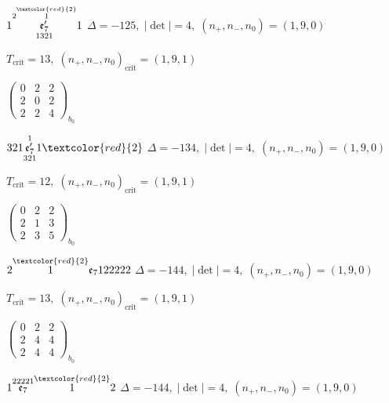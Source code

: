 \documentclass[10pt]{article}
\begin{document}
\smallskip

$1\overset{2\overset{\textcolor{red}{2}}{1}}{\underset{1321}{\mathfrak{e}_7'}}1$ \quad $\Delta=-125,\; |\det|=4,\; (n_+,n_-,n_0)=(1,9,0)$

\hspace{1em}$T_{\text{crit}}=13,\; (n_+,n_-,n_0)_{\text{crit}}=(1,9,1)$

\hspace{2em}$\left(\begin{smallmatrix}0 & 2 & 2 \\ 2 & 0 & 2 \\ 2 & 2 & 4\end{smallmatrix}\right)_{\!b_0}$

\smallskip

$321\overset{1}{\underset{321}{\mathfrak{e}_7'}}1\textcolor{red}{2}$ \quad $\Delta=-134,\; |\det|=4,\; (n_+,n_-,n_0)=(1,9,0)$

\hspace{1em}$T_{\text{crit}}=12,\; (n_+,n_-,n_0)_{\text{crit}}=(1,9,1)$

\hspace{2em}$\left(\begin{smallmatrix}0 & 2 & 2 \\ 2 & 1 & 3 \\ 2 & 3 & 5\end{smallmatrix}\right)_{\!b_0}$

\smallskip

$2\overset{\textcolor{red}{2}}{1}\mathfrak{e}_7122222$ \quad $\Delta=-144,\; |\det|=4,\; (n_+,n_-,n_0)=(1,9,0)$

\hspace{1em}$T_{\text{crit}}=13,\; (n_+,n_-,n_0)_{\text{crit}}=(1,9,1)$

\hspace{2em}$\left(\begin{smallmatrix}0 & 2 & 2 \\ 2 & 4 & 4 \\ 2 & 4 & 4\end{smallmatrix}\right)_{\!b_0}$

\smallskip

$1\overset{22221}{\mathfrak{e}_7}\overset{\textcolor{red}{2}}{1}2$ \quad $\Delta=-144,\; |\det|=4,\; (n_+,n_-,n_0)=(1,9,0)$
\end{document}
